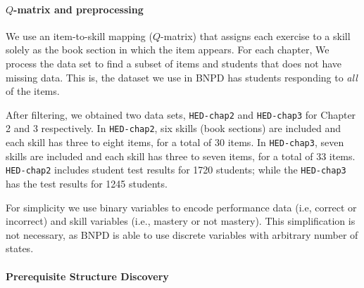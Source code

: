 \documentclass{edm_template}
\newcommand{\hl}[1]{\colorbox{yellow}{#1}}
\begin{document}
{	%
	
	\paragraph{$Q$-matrix and preprocessing}
	\label{sec:preprocessing}
	We use an item-to-skill mapping ($Q$-matrix) that assigns each exercise to a skill solely as the book section in which the item appears.
	For each chapter, We process the data set to find a subset of  items and students that does not have missing data.
	This is,  the dataset we use in BNPD has students responding to \textit{all} of the  items.
	
	After filtering, we obtained two data sets, \texttt{HED-chap2} and \texttt{HED-chap3} for Chapter 2 and 3 respectively.  
	In \texttt{HED-chap2}, six skills (book sections) are included and each skill has three to eight items, for a total of 30  items.
	In \texttt{HED-chap3}, seven skills are included and each skill has three to seven items, for a total of 33 items.
	\texttt{HED-chap2} includes student test results for 1720 students;
	while the \texttt{HED-chap3} has the test results for 1245 students.
	
	For simplicity we use binary variables to encode  performance data (i.e, correct or incorrect) and skill variables  (i.e., mastery or not mastery).
	This simplification is not necessary,  as BNPD is able to use  discrete variables with arbitrary number of states.
	
	\paragraph{Prerequisite Structure Discovery}
	\label{sec:prerequisite_results}
	
}
\end{document}
